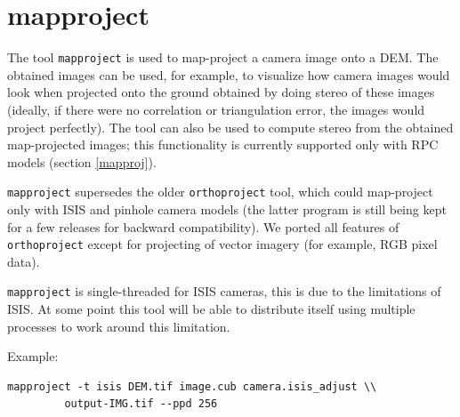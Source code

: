 \section{mapproject}
\label{mapproject}

The tool \texttt{mapproject} is used to map-project a camera image onto
a DEM. The obtained images can be used, for example, to visualize how
camera images would look when projected onto the ground obtained by
doing stereo of these images (ideally, if there were no correlation or
triangulation error, the images would project perfectly). The tool can
also be used to compute stereo from the obtained map-projected images;
this functionality is currently supported only with RPC models (section
\ref{mapproj}).

\texttt{mapproject} supersedes the older
\texttt{orthoproject} tool, which could map-project only with ISIS and
pinhole camera models (the latter program is still being kept for a few
releases for backward compatibility). We ported all features of
\texttt{orthoproject} except for projecting of vector imagery (for
example, RGB pixel data).

\texttt{mapproject} is single-threaded for ISIS cameras, this is due to
the limitations of ISIS. At some point this tool will be able to
distribute itself using multiple processes to work around this limitation.


Example:
\begin{verbatim}
mapproject -t isis DEM.tif image.cub camera.isis_adjust \\
         output-IMG.tif --ppd 256
\end{verbatim}

